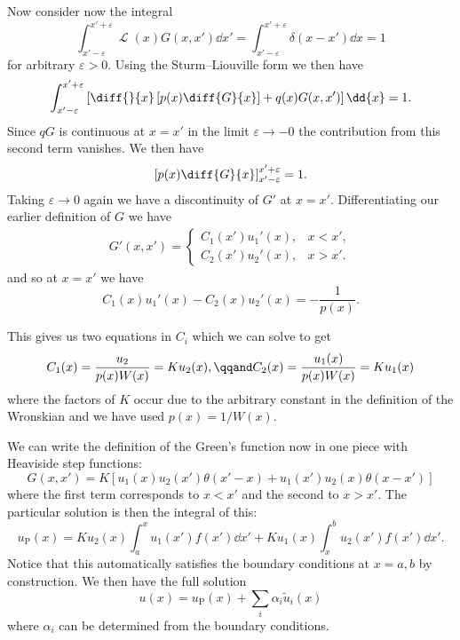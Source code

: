 \documentclass[fleqn]{NotesClass}
\DeclareMathOperator{\linop}{\mathcal{L}}
\begin{document}
    Now consider now the integral
    \begin{equation}
        \int_{x' - \varepsilon}^{x' + \varepsilon} \linop(x) G(x, x') \dd{x'} = \int_{x' - \varepsilon}^{x' + \varepsilon} \delta(x - x') \dd{x} = 1
    \end{equation}
    for arbitrary \(\varepsilon > 0\).
    Using the Sturm--Liouville form we then have
    \begin{equation}
        \int_{x' - \varepsilon}^{x' + \varepsilon} \left[ \diff{}{x}\left[ p(x) \diff{G}{x} \right] + q(x)G(x, x') \right] \dd{x} = 1.
    \end{equation}
    Since \(qG\) is continuous at \(x = x'\) in the limit \(\varepsilon \to -0\) the contribution from this second term vanishes.
    We then have
    \begin{equation}
        \left[ p(x)\diff{G}{x} \right]_{x' - \varepsilon}^{x' + \varepsilon} = 1.
    \end{equation}
    Taking \(\varepsilon \to 0\) again we have a discontinuity of \(G'\) at \(x = x'\).
    Differentiating our earlier definition of \(G\) we have
    \begin{align}
        G'(x, x') = 
        \begin{cases}
            C_1(x')u_1'(x), & x < x',\\
            C_2(x')u_2'(x), & x > x'.
        \end{cases}
    \end{align}
    and so at \(x = x'\) we have
    \begin{equation}
        C_1(x)u_1'(x) - C_2(x)u_2'(x) = -\frac{1}{p(x)}.
    \end{equation}
    
    This gives us two equations in \(C_i\) which we can solve to get
    \begin{equation}
        C_1(x) = \frac{u_2}{p(x)W(x)} = Ku_2(x), \qqand C_2(x) = \frac{u_1(x)}{p(x)W(x)} = Ku_1(x)
    \end{equation}
    where the factors of \(K\) occur due to the arbitrary constant in the definition of the Wronskian and we have used \(p(x) = 1/W(x)\).
    
    We can write the definition of the Green's function now in one piece with Heaviside step functions:
    \begin{equation}
        G(x, x') = K[u_1(x)u_2(x')\theta(x' - x) + u_1(x')u_2(x)\theta(x - x')]
    \end{equation}
    where the first term corresponds to \(x < x'\) and the second to \(x > x'\).
    The particular solution is then the integral of this:
    \begin{equation}
        u_{\mathrm{P}}(x) = Ku_2(x) \int_a^x u_1(x') f(x') \dd{x'} + Ku_1(x)\int_x^b u_2(x') f(x') \dd{x'}.
    \end{equation}
    Notice that this automatically satisfies the boundary conditions at \(x = a, b\) by construction.
    We then have the full solution
    \begin{equation}
        u(x) = u_{\mathrm{P}}(x) + \sum_{i} \alpha_i \tilde{u}_i(x)
    \end{equation}
    where \(\alpha_i\) can be determined from the boundary conditions.
    
\end{document}
